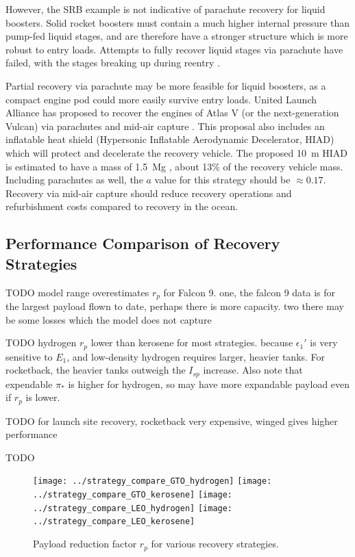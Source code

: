 \documentclass[conf]{new-aiaa}
\begin{document}
However, the SRB example is not indicative of parachute recovery for liquid boosters. Solid rocket boosters must contain a much higher internal pressure than pump-fed liquid stages, and are therefore have a stronger structure which is more robust to entry loads. Attempts to fully recover liquid stages via parachute have failed, with the stages breaking up during reentry \cite{Spencer2011}.

Partial recovery via parachute may be more feasible for liquid boosters, as a compact engine pod could more easily survive entry loads. United Launch Alliance has proposed to recover the engines of Atlas V (or the next-generation Vulcan) via parachutes and mid-air capture \cite{Gravlee2008, Ragab2015}. This proposal also includes an inflatable heat shield (Hypersonic Inflatable Aerodynamic Decelerator, HIAD) which will protect and decelerate the recovery vehicle. The proposed \SI{10}{\meter} HIAD is estimated to have a mass of \SI{1.5}{\mega\gram} \cite{Bose2009}, about 13\% of the recovery vehicle mass. Including parachutes as well, the $a$ value for this strategy should be $\approx 0.17$. Recovery via mid-air capture should reduce recovery operations and refurbishment costs compared to recovery in the ocean.


\subsection{Performance Comparison of Recovery Strategies}

TODO model range overestimates $r_p$ for Falcon 9. one, the falcon 9 data is for the largest payload flown to date, perhaps there is more capacity. two there may be some losses which the model does not capture

TODO hydrogen $r_p$ lower than kerosene for most strategies. because $\epsilon_1'$ is very sensitive to $E_1$, and low-density hydrogen requires larger, heavier tanks. For rocketback, the heavier tanks outweigh the $I_{sp}$ increase. Also note that expendable $\pi_*$ is higher for hydrogen, so may have more expandable payload even if $r_p$ is lower.

TODO for launch site recovery, rocketback very expensive, winged gives higher performance

TODO

\begin{figure}[hbt!]
	\centering
	\texttt{[image: ../strategy\_compare\_GTO\_hydrogen]}
	\texttt{[image: ../strategy\_compare\_GTO\_kerosene]}
	\texttt{[image: ../strategy\_compare\_LEO\_hydrogen]}
	\texttt{[image: ../strategy\_compare\_LEO\_kerosene]}
	\caption{\label{fig:strategy_compare_rp} Payload reduction factor $r_p$ for various recovery strategies.}
\end{figure}
\end{document}
